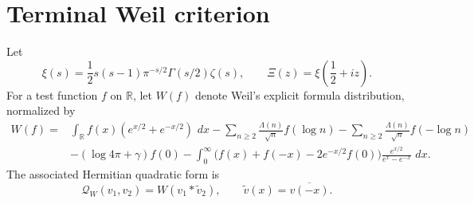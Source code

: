 \documentclass[11pt]{amsart}
\theoremstyle{definition}
\theoremstyle{remark}
\newcommand{\R}{\mathbb R}
\newcommand{\dd}{\,d}
\newcommand{\QW}{\mathcal Q_W}
\newcommand{\XiR}{\Xi}
\begin{document}
\begin{abstract}
Finally, we synthesize six terminal formulations reached by the route---a
signed limit, a Schur surplus, a Rosati factorization, an equivariant
Hilbert majorant, closure-faithful descent, and a positive global
polarization.  For the first, second and last of them the implication to Weil
positivity is proved here (the second only on even tests and under the
ground-state identity, the last under a hypothesis on CCM degree one); the third is a restatement and the fourth and fifth are only
formulated.  In each case the unproved assertion is the terminal
statement itself.  Their common
endpoint is analyzed by two complementary obstructions.  Four forgetful
functors are divisor-blind under explicit deformations (for one of them,
the cyclic Chern character, this is stated, not proved here), while the ordinary
Hilbert pushout fails separately by point-versus-continuous spectral type.
We formulate both mechanisms and isolate two open programs.  One
is geometric: construct an arithmetic intersection product and Hodge-index
polarization on a suitable square of the arithmetic curve.  The other is
analytic but necessarily divisor-sensitive: construct a resonant nuclear
or derived completion retaining evaluation jets before Hilbert reduction.
No proof of either final positivity theorem is claimed.
\end{abstract}

\maketitle
\tableofcontents

\section{Terminal Weil criterion}

Let
\[
 \xi(s)=\frac12s(s-1)\pi^{-s/2}\Gamma(s/2)\zeta(s),
 \qquad
 \XiR(z)=\xi\!\left(\frac12+iz\right).
\]
For a test function \(f\) on \(\R\), let \(W(f)\) denote Weil's explicit
formula distribution, normalized by
\[
\begin{aligned}
 W(f)=&
 \int_\R f(x)(e^{x/2}+e^{-x/2})\,\dd x
 -\sum_{n\ge2}\frac{\Lambda(n)}{\sqrt n}f(\log n)
 -\sum_{n\ge2}\frac{\Lambda(n)}{\sqrt n}f(-\log n)\\
&-(\log 4\pi+\gamma)f(0)
 -\int_0^\infty
 \bigl(f(x)+f(-x)-2e^{-x/2}f(0)\bigr)\frac{e^{x/2}}{e^{x}-e^{-x}}\,\dd x .
\end{aligned}
\tag{1.1}
\]
The associated Hermitian quadratic form is
\[
 \QW(v_1,v_2)=W(v_1*\widetilde v_2),
 \qquad \widetilde v(x)=\overline{v(-x)}.
\tag{1.2}
\]
\end{document}
